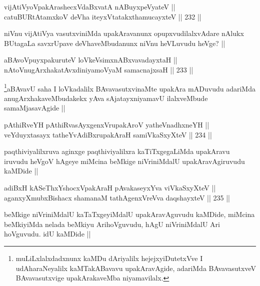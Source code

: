 \begin{shl}
vijAtiVyoVpakArashecxVdaBxvatA nABuyxpeVyateV || \\
catuBURtAtamxkoV deVha iteyxVtatakxthamucayxteV ||  232 ||  
\end{shl}

\begin{artha}
niVnu vijAtiVya vasutxviniMda upakAravanunx opupxvudilalxvAdare nAlukx BUtagaLa savxrUpave deVhaveMbudanunx niVnu heVLuvudu heVge? ||
\end{artha}

\begin{shl}
aBAvoV\s puyxpakuruteV loVkeV\s simxnABxvavadayxtaH ||  \\
nAtoV\s nugArxhakatAvxdiniyamoV\s yaM samacnajxsaH ||  233 || 
\end{shl}

\begin{artha}
\footnote{muLiLxlalxdadxnunx kaMDu dAriyalilx hejejxyiDutetxVve I udAharaNeyalilx kaMTakABavavu upakAravAgide, adariMda BAvavasutxveV BAvavasutxvige upakArakaveMba niyamavilalx.}aBAvavU saha I loVkadalilx BAvavasutxvinaMte upakAra mADuvudu adariMda anugArxhakaveMbudakekx yAva sAjatayxniyamavU ilalxveMbude samaMjasavAgide ||
\end{artha}

\begin{shl}
pAthiRveYH pAthiRvasAyxgenxVrupakAroV yatheVnadhxneYH || \\
veYduyxtasayx tatheYvAdiBxrupakAraH samiVkaSxyXteV ||  234 ||  
\end{shl}

\begin{artha}
paqthiviyalilxruva aginxge paqthiviyalilxra kaTiTxgegaLiMda upakAravu iruvudu heVgoV hAgeye miMcina beMkige niVriniMdalU upakAravAgiruvudu kaMDide ||
\end{artha}

\begin{shl}
adiBxH kASeThxYshocxVpakAraH pAvakaseyxYva viVkaSxyXteV || \\
aganxyXmubxBishacx shamanaM tathA\s genxVreVva daqshayxteV ||  235 ||  
\end{shl}

\begin{artha}
beMkige niVriniMdalU kaTaTxgeyiMdalU upakAravAguvudu kaMDide, miMcina beMkiyiMda nelada beMkiyu ArihoVguvudu, hAgU niVriniMdalU Ari hoVguvudu. idU kaMDide ||
\end{artha}

